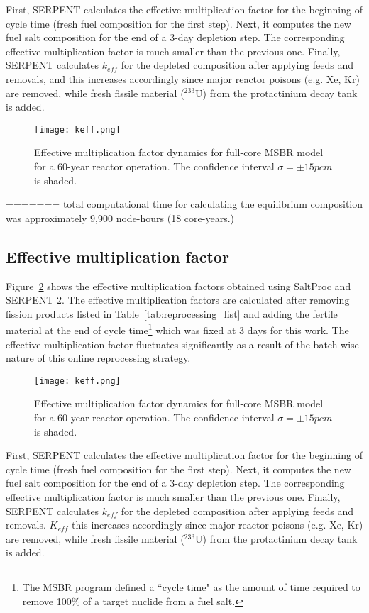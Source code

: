 First, SERPENT calculates the effective multiplication factor for the beginning 
of cycle time (fresh fuel composition for the first step). Next, it computes the 
new fuel salt composition for the end of a 3-day depletion step. The 
corresponding effective multiplication factor is much smaller than the previous 
one. Finally, SERPENT calculates $k_{eff}$ for the depleted composition after 
applying feeds and removals, and this increases accordingly since major reactor 
poisons (e.g. Xe, Kr) are removed, while fresh fissile material ($^{233}$U) from 
the protactinium decay tank is added. 
\begin{figure}[ht!] %
  \centering
  \texttt{[image: keff.png]}
  \caption{Effective multiplication factor dynamics for full-core \gls{MSBR} 
model for a 60-year reactor operation. The confidence interval $\sigma=\pm15pcm$ 
is shaded.}
  \label{fig:keff}
\end{figure}
=======
total computational time for calculating the equilibrium composition was 
approximately 9,900 node-hours (18 core-years.)

\subsection{Effective multiplication factor}
Figure~\ref{fig:keff} shows the effective multiplication factors 
obtained using SaltProc and SERPENT 2. The effective multiplication factors are 
calculated after removing fission products listed in 
Table~\ref{tab:reprocessing_list} and adding the fertile material at the end of 
cycle time\footnote{ The \gls{MSBR} program defined a ``cycle time" as the 
        amount of time required to remove 100\% of a target nuclide from a fuel 
salt.} which was fixed at 3 days for this work. The effective multiplication 
factor fluctuates significantly as a result of the batch-wise nature of this 
online reprocessing strategy. 

\begin{figure}[ht!] 
  \centering
  \texttt{[image: keff.png]}
  \caption{Effective multiplication factor dynamics for full-core \gls{MSBR} 
  model for a 60-year reactor operation. The confidence interval 
  $\sigma=\pm15pcm$ is shaded.}
  \label{fig:keff}
\end{figure}

First, SERPENT calculates the effective multiplication factor for the beginning 
of cycle time (fresh fuel composition for the first step). Next, it computes 
the new fuel salt composition for the end of a 3-day depletion step. The 
corresponding effective multiplication factor is much smaller than the previous 
one. Finally, SERPENT calculates $k_{eff}$ for the depleted composition after 
applying feeds and removals. $K_{eff}$ this increases accordingly since major reactor 
poisons (e.g. Xe, Kr) are removed, while fresh fissile material ($^{233}$U) 
from the protactinium decay tank is added.  

